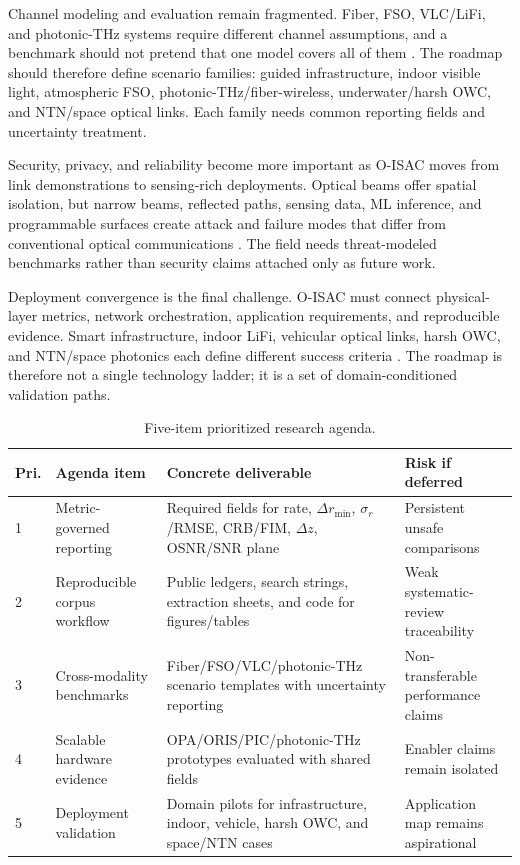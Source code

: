 \documentclass[letterpaper,journal]{IEEEtran}
\begin{document}
Channel modeling and evaluation remain fragmented. Fiber, FSO, VLC/LiFi, and photonic-THz systems require different channel assumptions, and a benchmark should not pretend that one model covers all of them \cite{O_ISAC_005,O_ISAC_023,O_ISAC_035,O_ISAC_039,O_ISAC_041,O_ISAC_050}. The roadmap should therefore define scenario families: guided infrastructure, indoor visible light, atmospheric FSO, photonic-THz/fiber-wireless, underwater/harsh OWC, and NTN/space optical links. Each family needs common reporting fields and uncertainty treatment.

Security, privacy, and reliability become more important as O-ISAC moves from link demonstrations to sensing-rich deployments. Optical beams offer spatial isolation, but narrow beams, reflected paths, sensing data, ML inference, and programmable surfaces create attack and failure modes that differ from conventional optical communications \cite{O_ISAC_093,O_ISAC_112,O_ISAC_133,O_ISAC_134,O_ISAC_151,O_ISAC_381}. The field needs threat-modeled benchmarks rather than security claims attached only as future work.

Deployment convergence is the final challenge. O-ISAC must connect physical-layer metrics, network orchestration, application requirements, and reproducible evidence. Smart infrastructure, indoor LiFi, vehicular optical links, harsh OWC, and NTN/space photonics each define different success criteria \cite{O_ISAC_025,O_ISAC_059,O_ISAC_064,O_ISAC_127,O_ISAC_164,O_ISAC_220,O_ISAC_237}. The roadmap is therefore not a single technology ladder; it is a set of domain-conditioned validation paths.

\begin{table}[!t]
    \caption{Five-item prioritized research agenda.}
    \label{tab:viii_f_2}
    \centering
    \scriptsize
    \setlength{\tabcolsep}{2.8pt}
    \renewcommand{\arraystretch}{1.08}
    \begin{tabularx}{\textwidth}{@{}p{0.55cm}p{2.7cm}X p{2.15cm}@{}}
        \toprule
        Pri. & Agenda item & Concrete deliverable & Risk if deferred \\
        \midrule
        1 & Metric-governed reporting & Required fields for rate, $\Delta r_{\min}$, $\sigma_r$/RMSE, CRB/FIM, $\Delta z$, OSNR/SNR plane & Persistent unsafe comparisons \\
        2 & Reproducible corpus workflow & Public ledgers, search strings, extraction sheets, and code for figures/tables & Weak systematic-review traceability \\
        3 & Cross-modality benchmarks & Fiber/FSO/VLC/photonic-THz scenario templates with uncertainty reporting & Non-transferable performance claims \\
        4 & Scalable hardware evidence & OPA/ORIS/PIC/photonic-THz prototypes evaluated with shared fields & Enabler claims remain isolated \\
        5 & Deployment validation & Domain pilots for infrastructure, indoor, vehicle, harsh OWC, and space/NTN cases & Application map remains aspirational \\
        \bottomrule
    \end{tabularx}
\end{table}
\end{document}
